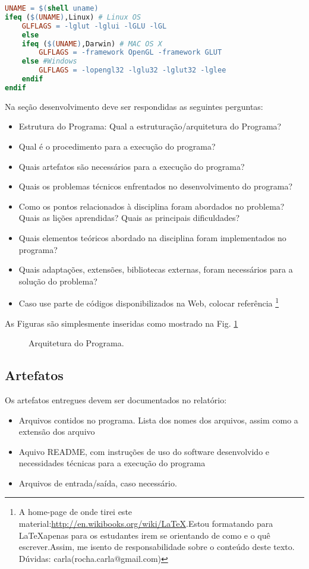 \begin{lstlisting}[language=make,title=\textit{Makefile},firstnumber=8,numbers=none]
UNAME = $(shell uname)
ifeq ($(UNAME),Linux) # Linux OS
	GLFLAGS = -lglut -lglui -lGLU -lGL 
	else
	ifeq ($(UNAME),Darwin) # MAC OS X
		GLFLAGS = -framework OpenGL -framework GLUT
	else #Windows
		GLFLAGS = -lopengl32 -lglu32 -lglut32 -lglee
	endif
endif
\end{lstlisting}


Na seção desenvolvimento deve ser respondidas as seguintes perguntas:
 
	\begin{itemize}
		\item Estrutura do Programa: Qual a estruturação/arquitetura do Programa?
	 	\item Qual é o procedimento para a execução do programa? 
	 	\item Quais artefatos são necessários para a execução do programa?
	 	\item Quais os problemas técnicos enfrentados no desenvolvimento do programa?
	 	\item Como os pontos relacionados à disciplina foram abordados no problema? Quais as lições aprendidas? Quais as principais dificuldades?
	 	\item Quais elementos teóricos abordado na disciplina foram implementados no programa?
	 	\item Quais adaptações, extensões, bibliotecas externas, foram necessários para a solução do problema?
	 	\item Caso use parte de códigos disponibilizados na Web, colocar referência \footnote{A home-page de onde tirei
este material:\url{http://en.wikibooks.org/wiki/LaTeX}.Estou formatando para \LaTeX apenas para os estudantes irem se orientando de como e o quê escrever.Assim, me isento de responsabilidade sobre o conteúdo deste texto. Dúvidas: carla(rocha.carla@gmail.com)}
	\end{itemize}
	
	As Figuras são simplesmente inseridas como mostrado na Fig. \ref{Fig1}
	
\begin{figure}[ht]
  \centering
   \caption{Arquitetura do Programa.}
  \label{Fig1}
\end{figure}
 
\subsection{Artefatos}
\label{SebSec:Artefatos}
Os artefatos entregues devem ser documentados no relatório:
\begin{itemize}
\item Arquivos contidos no programa. Lista dos nomes dos arquivos, assim como a extensão dos arquivo
\item Aquivo README, com instruções de uso do software desenvolvido e necessidades técnicas para a execução do programa
\item Arquivos de entrada/saída, caso necessário.
\end{itemize}

